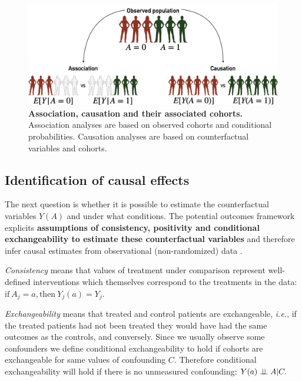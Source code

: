 \documentclass[a4paper,12pt,twoside,onecolumn,openright,final,oldfontcommands]{memoir}
\begin{document}
\begin{figure}

{\centering \includegraphics[width=0.9\linewidth]{fig/causality} 

}

\caption[Association, causation and their associated cohorts]{\textbf{Association, causation and their
associated cohorts.} Association analyses are based on observed cohorts
and conditional probabilities. Causation analyses are based on
counterfactual variables and cohorts.}\label{fig:causality}
\end{figure}






\subsection{Identification of causal
effects}\label{causal-identification-simple}

The next question is whether it is possible to estimate the
counterfactual variables \(Y(A)\) and under what conditions. The
potential outcomes framework explicits \textbf{assumptions of
consistency, positivity and conditional exchangeability to estimate
these counterfactual variables} and therefore infer causal estimates
from observational (non-randomized) data
\citep{rubin1974estimating, hernan2020causal}.

\emph{Consistency} means that values of treatment under comparison
represent well-defined interventions which themselves correspond to the
treatments in the data:
\(\textrm{if} \: A_j=a, \textrm{then} \: Y_j(a)=Y_j.\)

\emph{Exchangeability} means that treated and control patients are
exchangeable, \emph{i.e.}, if the treated patients had not been treated
they would have had the same outcomes as the controls, and conversely.
Since we usually observe some confounders we define conditional
exchangeability to hold if cohorts are exchangeable for same values of
confounding \(C\). Therefore conditional exchangeability will hold if
there is no unmeasured confounding: \(Y(a) \perp \!\!\! \perp A | C.\)
\end{document}
